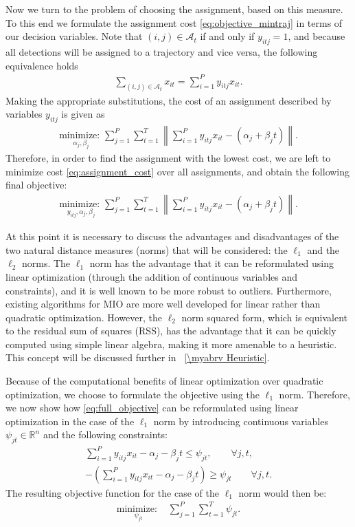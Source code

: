 Now we turn to the problem of choosing the assignment, based on this measure. To this end we formulate the assignment cost \eqref{eq:objective_mintraj} in terms of our decision variables. Note that $(i,j)\in\mathcal{A}_t$ if and only if $y_{itj}=1$, and because all detections will be assigned to a trajectory and vice versa, the following equivalence holds
\begin{align}
\sum_{(i,j)\in \mathcal{A}_{t}} x_{it} = \sum_{i=1}^{P}y_{itj}x_{it}.
\end{align}
Making the appropriate substitutions, the cost of an assignment described by variables $y_{itj}$ is given as
\begin{align}\label{eq:assignment_cost}
 \underset{\alpha_{j}, \beta_{j}}{\text{minimize: }} \sum_{j=1}^{P} \sum_{t=1}^{T}  \left \| \sum_{i=1}^{P}y_{itj}x_{it} - (\alpha_{j} + \beta_{j}t)\right \|.
\end{align}
Therefore, in order to find the assignment with the lowest cost, we are left to minimize cost \eqref{eq:assignment_cost} over all assignments, and obtain the following final objective: 
\begin{align}\label{eq:full_objective}
 \underset{y_{itj}, \alpha_{j}, \beta_{j}}{\text{minimize: }}\sum_{j=1}^{P} \sum_{t=1}^{T}  \left \| \sum_{i=1}^{P}y_{itj}x_{it} - (\alpha_{j} + \beta_{j}t) \right \|.
\end{align}

At this point it is necessary to discuss the advantages and disadvantages of the two natural distance measures (norms) that will be considered: the $\ell_1$ and the $\ell_2$ norms. The $\ell_1$ norm has the advantage that it can be reformulated using linear optimization (through the addition of continuous variables and constraints), and it is well known to be more robust to outliers. Furthermore, existing algorithms for MIO are more well developed for linear rather than quadratic optimization. However, the $\ell_2$ norm squared form, which is equivalent to the residual sum of squares (RSS), has the advantage that it can be quickly computed using simple linear algebra, making it more amenable to a heuristic. This concept will be discussed further in \mysection~\ref{\myabrv Heuristic}.

Because of the computational benefits of linear optimization over quadratic optimization, we choose to formulate the objective using the $\ell_1$ norm. Therefore, we now show how \eqref{eq:full_objective} can be reformulated using linear optimization in the case of the $\ell_1$ norm by introducing continuous variables $\psi_{jt} \in \mathbb{R}^n$ and the following constraints:
\begin{align}
\sum_{i=1}^{P}y_{itj}x_{it} - \alpha_{j} - \beta_{j}t \leq \psi_{jt}, \qquad \forall j,t,\\
-\left(\sum_{i=1}^{P}y_{itj}x_{it} - \alpha_{j} - \beta_{j}t\right) \geq \psi_{jt} \qquad \forall j,t.
\end{align}
The resulting objective function for the case of the $\ell_1$ norm would then be:
\begin{align}
\underset{\psi_{jt}}{\text{minimize: }} & \sum_{j=1}^{P} \sum_{t=1}^{T} \psi_{jt}.
\end{align}

